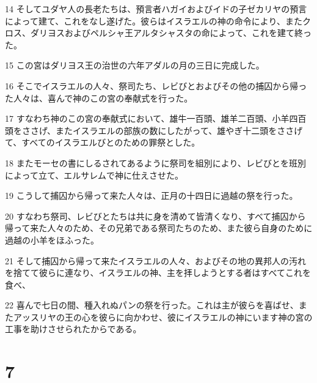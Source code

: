 \par 14 そしてユダヤ人の長老たちは、預言者ハガイおよびイドの子ゼカリヤの預言によって建て、これをなし遂げた。彼らはイスラエルの神の命令により、またクロス、ダリヨスおよびペルシャ王アルタシャスタの命によって、これを建て終った。
\par 15 この宮はダリヨス王の治世の六年アダルの月の三日に完成した。
\par 16 そこでイスラエルの人々、祭司たち、レビびとおよびその他の捕囚から帰った人々は、喜んで神のこの宮の奉献式を行った。
\par 17 すなわち神のこの宮の奉献式において、雄牛一百頭、雄羊二百頭、小羊四百頭をささげ、またイスラエルの部族の数にしたがって、雄やぎ十二頭をささげて、すべてのイスラエルびとのための罪祭とした。
\par 18 またモーセの書にしるされてあるように祭司を組別により、レビびとを班別によって立て、エルサレムで神に仕えさせた。
\par 19 こうして捕囚から帰って来た人々は、正月の十四日に過越の祭を行った。
\par 20 すなわち祭司、レビびとたちは共に身を清めて皆清くなり、すべて捕囚から帰って来た人々のため、その兄弟である祭司たちのため、また彼ら自身のために過越の小羊をほふった。
\par 21 そして捕囚から帰って来たイスラエルの人々、およびその地の異邦人の汚れを捨てて彼らに連なり、イスラエルの神、主を拝しようとする者はすべてこれを食べ、
\par 22 喜んで七日の間、種入れぬパンの祭を行った。これは主が彼らを喜ばせ、またアッスリヤの王の心を彼らに向かわせ、彼にイスラエルの神にいます神の宮の工事を助けさせられたからである。

\chapter{7}

